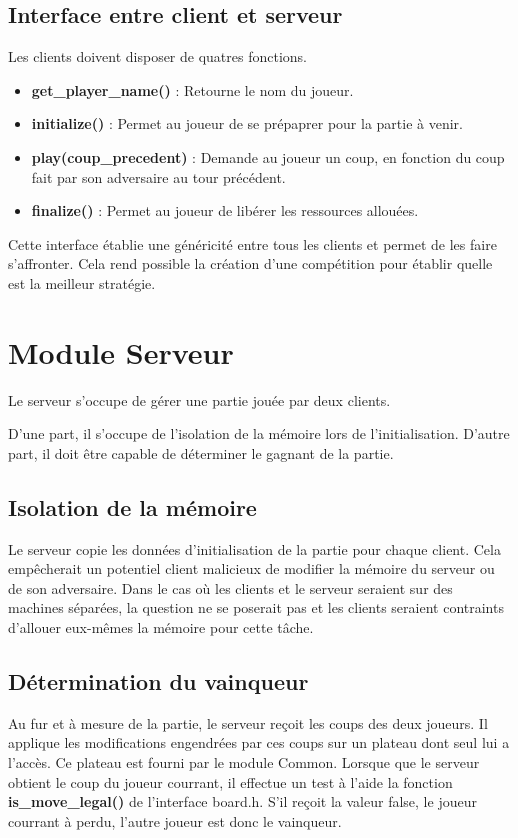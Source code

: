 \documentclass{article}
\begin{document}
\subsection{Interface entre client et serveur}

Les clients doivent disposer de quatres fonctions.
\begin{itemize}
    \item \textbf{get\_player\_name()} : Retourne le nom du joueur.
    \item \textbf{initialize()} : Permet au joueur de se prépaprer pour la partie à venir.
    \item \textbf{play(coup\_precedent)} : Demande au joueur un coup, en fonction 
    du coup fait par son adversaire au tour précédent.
    \item \textbf{finalize()} : Permet au joueur de libérer les ressources allouées.
\end{itemize}

Cette interface établie une généricité entre tous les clients et permet de les faire s'affronter.
Cela rend possible la création d'une compétition pour établir quelle est 
la meilleur stratégie.

\section{Module Serveur}

Le serveur s'occupe de gérer une partie jouée par deux clients. 

D'une part, il s'occupe de l'isolation de la mémoire lors de l'initialisation.
D'autre part, il doit être capable de déterminer le gagnant de la partie.


\subsection{Isolation de la mémoire}
Le serveur copie les données d'initialisation de la partie pour chaque client.
Cela empêcherait un potentiel client malicieux de modifier la mémoire du serveur ou 
de son adversaire.
Dans le cas où les clients et le serveur seraient sur des machines séparées, 
la question ne se poserait pas et les clients seraient contraints
d'allouer eux-mêmes la mémoire pour cette tâche.

\subsection{Détermination du vainqueur}
Au fur et à mesure de la partie, le serveur reçoit les coups des deux joueurs.
Il applique les modifications engendrées par ces coups sur un plateau dont seul lui a l'accès.
Ce plateau est fourni par le module Common. Lorsque que le serveur obtient le coup 
du joueur courrant, il effectue un test à l'aide la fonction \textbf{is\_move\_legal()} de l'interface board.h.
S'il reçoit la valeur false, le joueur courrant à perdu, l'autre joueur est donc le vainqueur.
\end{document}
